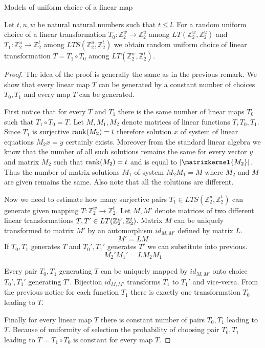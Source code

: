 \begin{section}{Models of uniform choice of a linear map}
\begin{remark}
\label{remark-model-uniform-linear-map-selection}
Let $t, u, w$ be natural natural numbers such that $t \leq l$. For a random uniform choice of a linear transformation $T_0: \mathbb{Z}_2^w \rightarrow \mathbb{Z}_2^u$ among $LT(\mathbb{Z}_2^w, \mathbb{Z}_2^u)$ and $T_1: \mathbb{Z}_2^u \rightarrow \mathbb{Z}_2^t$ among $LTS(\mathbb{Z}_2^u, \mathbb{Z}_2^t)$ we obtain random uniform choice of linear transformation $T = T_1 \circ T_0$ among $LT(\mathbb{Z}_2^w, \mathbb{Z}_2^t)$.
\end{remark}
\begin{proof}
The idea of the proof is generally the same as in the previous remark. We show that every linear map $T$ can be generated by a constant number of choices $T_0, T_1$ and every map $T$ can be generated.

First notice that for every $T$ and $T_1$ there is the same number of linear maps $T_0$ such that $T_1 \circ T_0 = T$. Let $M, M_1, M_2$ denote matrices of linear functions $T, T_0, T_1$. Since $T_1$ is surjective $\mathrm{rank}(M_2) = t$ therefore solution $x$ of system of linear equations $M_2 x = y$ certainly exists. Moreover from the standard linear algebra we know that the number of all such solutions remains the same for every vector $y$ and matrix $M_2$ such that $\mathrm{rank}(M_2) = t$ and is equal to $|\matrixkernel{M_2}|$. Thus the number of matrix solutions $M_1$ of system $M_2 M_1 = M$ where $M_2$ and $M$ are given remains the same. Also note that all the solutions are different.

Now we need to estimate how many surjective pairs $T_1 \in LTS(\mathbb{Z}_2^u, \mathbb{Z}_2^t)$ can generate given mapping $T: \mathbb{Z}_2^w \rightarrow \mathbb{Z}_2^t$. Let $M, M'$ denote matrices of two different linear transformations $T, T' \in LT(\mathbb{Z}_{2}^{w}, \mathbb{Z}_{2}^{t})$. Matrix $M$ can be uniquely transformed to matrix $M'$ by an automorphism $id_{M, M'}$ defined by matrix $L$.
\[
	M' = LM
\]
If $T_0, T_1$ generates $T$ and $T_0', T_1'$ generates $T'$ we can substitute into previous.
\[
	M_2' M_1' = L M_2 M_1
\]

Every pair $T_0, T_1$ generating $T$ can be uniquely mapped by $id_{M, M'}$ onto choice $T_0', T_1'$ generating $T'$. Bijection $id_{M, M'}$ transforms $T_1$ to $T_1'$ and vice-versa. From the previous notice for each function $T_1$ there is exactly one transformation $T_0$ leading to $T$.

Finally for every linear map $T$ there is constant number of pairs $T_0, T_1$ leading to $T$. Because of uniformity of selection the probability of choosing pair $T_0, T_1$ leading to $T = T_1 \circ T_0$ is constant for every map $T$.
\end{proof}
\end{section}
